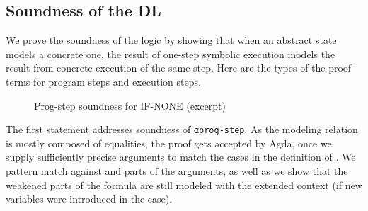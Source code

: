 
\subsection{Soundness of the DL}\label{soundness}

We prove the soundness of the logic by showing that
when an abstract state models a concrete one,
the result of one-step symbolic execution models the result from
concrete execution of the same step.
Here are the types of the proof terms for program steps and execution
steps.
\SoundnessProgStep
\SoundnessExecStep






\begin{figure}[tp]
\SoundnessCaseIfNone
  \caption{Prog-step soundness for IF-NONE (excerpt)}
  \label{fig:prog-step-soundness-if-none}
\end{figure}

The first  statement addresses soundness of \verb/αprog-step/.
As the modeling relation is mostly composed of equalities, the proof
gets accepted by Agda, once we supply sufficiently precise arguments to match the cases in the definition
of . We pattern match against  and parts of the arguments,
as well as we show that the weakened parts of the formula
are still modeled with the extended context (if new variables were
introduced in the case).

